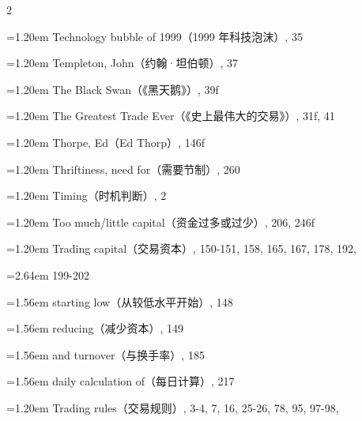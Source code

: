 {\begin{multicols}{2}
\par \noindent\hangindent=1.20em\hspace*{0.00em} Technology bubble of 1999（1999 年科技泡沫）, 35
\par \noindent\hangindent=1.20em\hspace*{0.00em} Templeton, John（约翰·坦伯顿）, 37
\par \noindent\hangindent=1.20em\hspace*{0.00em} The Black Swan（《黑天鹅》）, 39f
\par \noindent\hangindent=1.20em\hspace*{0.00em} The Greatest Trade Ever（《史上最伟大的交易》）, 31f, 41
\par \noindent\hangindent=1.20em\hspace*{0.00em} Thorpe, Ed（Ed Thorp）, 146f
\par \noindent\hangindent=1.20em\hspace*{0.00em} Thriftiness, need for（需要节制）, 260
\par \noindent\hangindent=1.20em\hspace*{0.00em} Timing（时机判断）, 2
\par \noindent\hangindent=1.20em\hspace*{0.00em} Too much/little capital（资金过多或过少）, 206, 246f
\par \noindent\hangindent=1.20em\hspace*{0.00em} Trading capital（交易资本）, 150-151, 158, 165, 167, 178, 192,
\par \noindent\hangindent=2.64em\hspace*{1.44em} 199-202
\par \noindent\hangindent=1.56em\hspace*{0.36em} starting low（从较低水平开始）, 148
\par \noindent\hangindent=1.56em\hspace*{0.36em} reducing（减少资本）, 149
\par \noindent\hangindent=1.56em\hspace*{0.36em} and turnover（与换手率）, 185
\par \noindent\hangindent=1.56em\hspace*{0.36em} daily calculation of（每日计算）, 217
\par \noindent\hangindent=1.20em\hspace*{0.00em} Trading rules（交易规则）, 3-4, 7, 16, 25-26, 78, 95, 97-98,

\end{multicols}}
